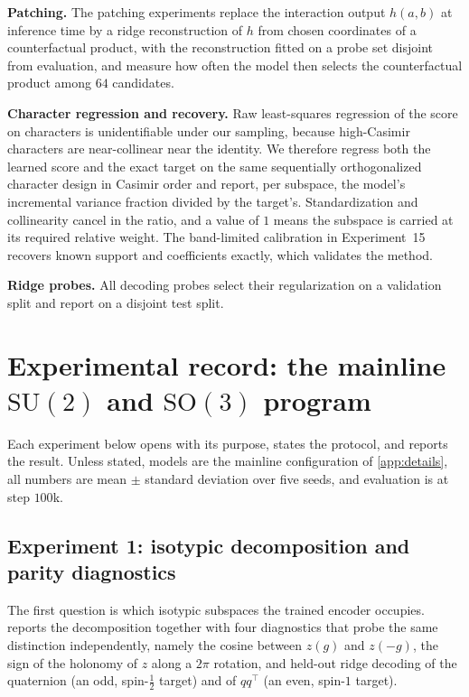 \documentclass{article}
\newcommand{\SU}{\mathrm{SU}}
\newcommand{\SO}{\mathrm{SO}}
\begin{document}
\textbf{Patching.} The patching experiments replace the interaction
output $h(a,b)$ at inference time by a ridge reconstruction of $h$
from chosen coordinates of a counterfactual product, with the
reconstruction fitted on a probe set disjoint from evaluation, and
measure how often the model then selects the counterfactual product
among $64$ candidates.

\textbf{Character regression and recovery.} Raw least-squares
regression of the score on characters is unidentifiable under our
sampling, because high-Casimir characters are near-collinear near the
identity. We therefore regress both the learned score and the exact
target on the same sequentially orthogonalized character design in
Casimir order and report, per subspace, the model's incremental
variance fraction divided by the target's. Standardization and
collinearity cancel in the ratio, and a value of $1$ means the
subspace is carried at its required relative weight. The band-limited
calibration in Experiment~15 recovers known support and coefficients
exactly, which validates the method.

\textbf{Ridge probes.} All decoding probes select their regularization
on a validation split and report on a disjoint test split.

\section{Experimental record: the mainline \texorpdfstring{$\SU(2)$ and $\SO(3)$}{SU(2) and SO(3)} program}
\label{app:mainline-exps}

Each experiment below opens with its purpose, states the protocol, and
reports the result. Unless stated, models are the mainline
configuration of \cref{app:details}, all numbers are mean $\pm$
standard deviation over five seeds, and evaluation is at step $100$k.

\subsection{Experiment 1: isotypic decomposition and parity diagnostics}

The first question is which isotypic subspaces the trained encoder
occupies.  reports the decomposition together with
four diagnostics that probe the same distinction independently, namely
the cosine between $z(g)$ and $z(-g)$, the sign of the holonomy of $z$
along a $2\pi$ rotation, and held-out ridge decoding of the quaternion
(an odd, spin-$\tfrac12$ target) and of $qq^\top$ (an even, spin-$1$
target).
\end{document}
